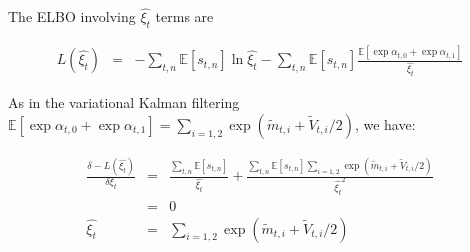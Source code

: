 \documentclass[11pt]{report}
\newcommand{\Ep}{\mathbb{E}}
\begin{document}
The ELBO involving $\hat{\xi_t}$ terms are 

\begin{eqnarray*}
L(\hat{\xi_t}) & = & - \sum_{t,n} \Ep[s_{t,n}] \ln \hat{\xi_t}  -  \sum_{t,n} \Ep[s_{t,n}] \frac{\Ep[\exp \alpha_{t,0} + \exp \alpha_{t,1} ]}{\hat{\xi_t}} 
\end{eqnarray*}

As in the variational Kalman filtering $\Ep[\exp \alpha_{t,0} + \exp \alpha_{t,1}]=\sum_{i=1,2} \exp (\tilde{m}_{t,i}+\tilde{V}_{t,i}/2)$, we have:

\begin{eqnarray}
\frac{\delta -L(\hat{\xi_t}) }{\delta \xi_t} & = & \frac{\sum_{t,n} \Ep[s_{t,n}] }{ \hat{\xi_t}  } + \frac{ \sum_{t,n} \Ep[s_{t,n}]  \sum_{i=1,2} \exp (\tilde{m}_{t,i}+\tilde{V}_{t,i}/2)}{\hat{\xi_t} ^2}\\\nonumber
& = & 0\\\nonumber
\hat{\xi_t} & = &  \sum_{i=1,2} \exp (\tilde{m}_{t,i}+\tilde{V}_{t,i}/2)
 \end{eqnarray}
\end{document}
